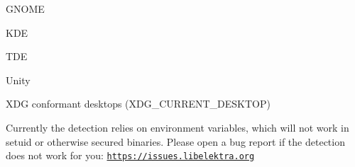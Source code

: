 \begin{DoxyItemize}
\item G\+N\+O\+ME
\item K\+DE
\item T\+DE
\item Unity
\item X\+DG conformant desktops ({\ttfamily X\+D\+G\+\_\+\+C\+U\+R\+R\+E\+N\+T\+\_\+\+D\+E\+S\+K\+T\+OP})
\end{DoxyItemize}

Currently the detection relies on environment variables, which will not work in setuid or otherwise secured binaries. Please open a bug report if the detection does not work for you\+: \href{https://issues.libelektra.org}{\tt https\+://issues.\+libelektra.\+org} 